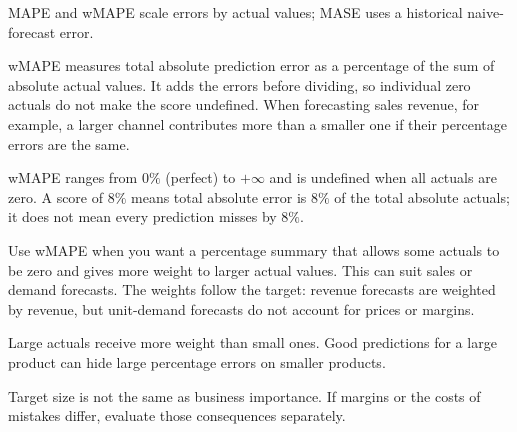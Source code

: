 \metricsecondary

MAPE and wMAPE scale errors by actual values; MASE uses a historical naive-forecast error.
\metricend
\clearpage
\thispagestyle{regressionstyle}
\label{sec:wmape}

wMAPE measures total absolute prediction error as a percentage of the sum of absolute actual values. It adds the errors before dividing, so individual zero actuals do not make the score undefined. When forecasting sales revenue, for example, a larger channel contributes more than a smaller one if their percentage errors are the same.

\begin{metricformula}
\end{metricformula}

wMAPE ranges from $0\%$ (perfect) to $+\infty$ and is undefined when all actuals are zero. A score of $8\%$ means total absolute error is $8\%$ of the total absolute actuals; it does not mean every prediction misses by $8\%$.


Use wMAPE when you want a percentage summary that allows some actuals to be zero and gives more weight to larger actual values. This can suit sales or demand forecasts. The weights follow the target: revenue forecasts are weighted by revenue, but unit-demand forecasts do not account for prices or margins.


{
    \item Large actuals receive more weight than small ones. Good predictions for a large product can hide large percentage errors on smaller products.
    \item Target size is not the same as business importance. If margins or the costs of mistakes differ, evaluate those consequences separately.
}

